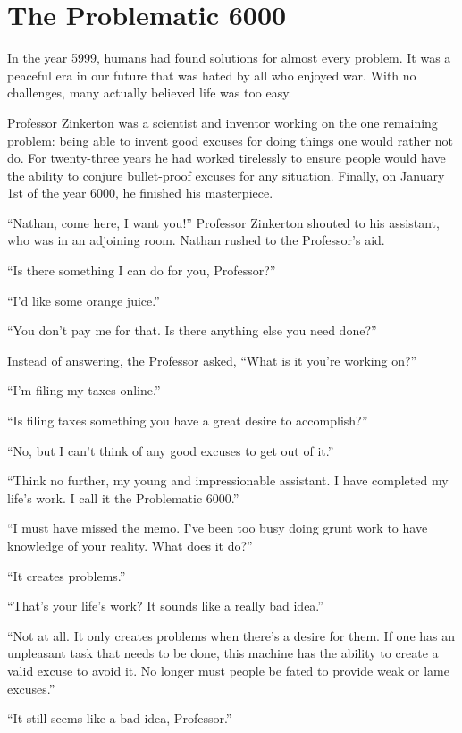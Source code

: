 \chapter{The Problematic 6000}

In the year 5999, humans had found solutions for almost every problem. It was a peaceful era in our future that was hated by all who enjoyed war. With no challenges, many actually believed life was too easy.

Professor Zinkerton was a scientist and inventor working on the one remaining problem: being able to invent good excuses for doing things one would rather not do. For twenty-three years he had worked tirelessly to ensure people would have the ability to conjure bullet-proof excuses for any situation. Finally, on January 1st of the year 6000, he finished his masterpiece.

“Nathan, come here, I want you!” Professor Zinkerton shouted to his assistant, who was in an adjoining room. Nathan rushed to the Professor's aid.

“Is there something I can do for you, Professor?”

“I'd like some orange juice.”

“You don't pay me for that. Is there anything else you need done?”

Instead of answering, the Professor asked, “What is it you're working on?”

“I'm filing my taxes online.”

“Is filing taxes something you have a great desire to accomplish?”

“No, but I can't think of any good excuses to get out of it.”

“Think no further, my young and impressionable assistant. I have completed my life's work. I call it the Problematic 6000.”

“I must have missed the memo. I've been too busy doing grunt work to have knowledge of your reality. What does it do?”

“It creates problems.”

“That's your life's work? It sounds like a really bad idea.”

“Not at all. It only creates problems when there's a desire for them. If one has an unpleasant task that needs to be done, this machine has the ability to create a valid excuse to avoid it. No longer must people be fated to provide weak or lame excuses.”

“It still seems like a bad idea, Professor.”


